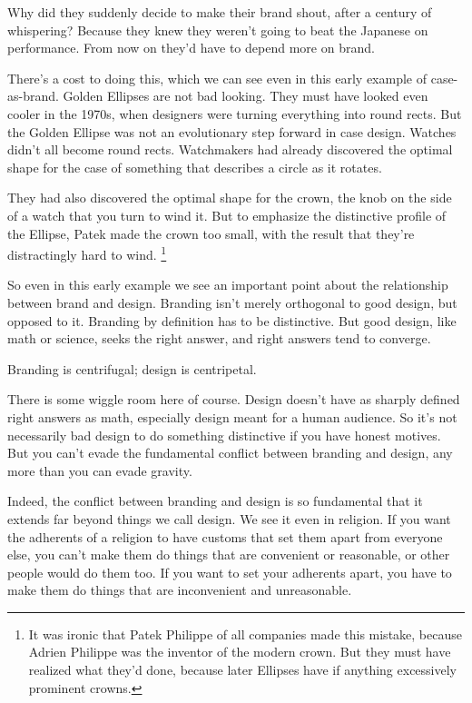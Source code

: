 Why did they suddenly decide to make their brand shout, after a century
of whispering? Because they knew they weren't going to beat the Japanese
on performance. From now on they'd have to depend more on brand.

There's a cost to doing this, which we can see even in this early
example of case-as-brand. Golden Ellipses are not bad looking. They must
have looked even cooler in the 1970s, when designers were turning
everything into round rects. But the Golden Ellipse was not an
evolutionary step forward in case design. Watches didn't all become
round rects. Watchmakers had already discovered the optimal shape for
the case of something that describes a circle as it rotates.

They had also discovered the optimal shape for the crown, the knob on
the side of a watch that you turn to wind it. But to emphasize the
distinctive profile of the Ellipse, Patek made the crown too small, with
the result that they're distractingly hard to wind.
\footnote{It was ironic that Patek Philippe of all companies made this
mistake, because Adrien Philippe was the inventor of the modern crown.
But they must have realized what they'd done, because later Ellipses
have if anything excessively prominent crowns.}

So even in this early example we see an important point about the
relationship between brand and design. Branding isn't merely orthogonal
to good design, but opposed to it. Branding by definition has to be
distinctive. But good design, like math or science, seeks the right
answer, and right answers tend to converge.

Branding is centrifugal; design is centripetal.

There is some wiggle room here of course. Design doesn't have as sharply
defined right answers as math, especially design meant for a human
audience. So it's not necessarily bad design to do something distinctive
if you have honest motives. But you can't evade the fundamental conflict
between branding and design, any more than you can evade gravity.

Indeed, the conflict between branding and design is so fundamental that
it extends far beyond things we call design. We see it even in religion.
If you want the adherents of a religion to have customs that set them
apart from everyone else, you can't make them do things that are
convenient or reasonable, or other people would do them too. If you want
to set your adherents apart, you have to make them do things that are
inconvenient and unreasonable.

